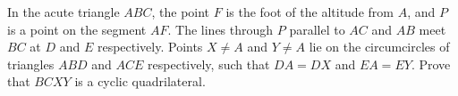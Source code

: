 In the acute triangle $ABC$, the point $F$ is the foot of the altitude from $A$,
and $P$ is a point on the segment $AF$.
The lines through $P$ parallel to $AC$ and $AB$ meet $BC$ at $D$ and $E$ respectively.
Points $X \neq A$ and $Y \neq A$ lie on the circumcircles of triangles $ABD$ and $ACE$ respectively,
such that $DA=DX$ and $EA=EY$.  
Prove that $BCXY$ is a cyclic quadrilateral. 
